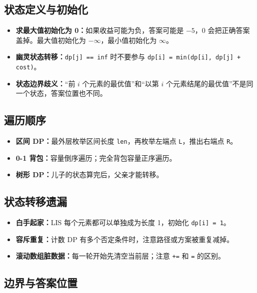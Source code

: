 \documentclass[UTF8,openany,oneside,zihao=-4]{ctexbook}
\begin{document}
\subsection{状态定义与初始化}

\begin{itemize}
  \item \textbf{求最大值初始化为 0：}如果收益可能为负，答案可能是 $-5$，0 会把正确答案盖掉。最大值初始化为 $-\infty$，最小值初始化为 $\infty$。
  \item \textbf{幽灵状态转移：}\lstinline!dp[j] == inf! 时不要参与 \lstinline!dp[i] = min(dp[i], dp[j] + cost)!。
  \item \textbf{状态边界歧义：}“前 $i$ 个元素的最优值”和“以第 $i$ 个元素结尾的最优值”不是同一个状态，答案位置也不同。
\end{itemize}

\subsection{遍历顺序}

\begin{itemize}
  \item \textbf{区间 DP：}最外层枚举区间长度 \lstinline!len!，再枚举左端点 \lstinline!L!，推出右端点 \lstinline!R!。
  \item \textbf{0-1 背包：}容量倒序遍历；完全背包容量正序遍历。
  \item \textbf{树形 DP：}儿子的状态算完后，父亲才能转移。
\end{itemize}

\subsection{状态转移遗漏}

\begin{itemize}
  \item \textbf{白手起家：}LIS 每个元素都可以单独成为长度 1，初始化 \lstinline!dp[i] = 1!。
  \item \textbf{容斥重复：}计数 DP 有多个否定条件时，注意路径或方案被重复减掉。
  \item \textbf{滚动数组脏数据：}每一轮开始先清空当前层；注意 \lstinline!+=! 和 \lstinline!=! 的区别。
\end{itemize}

\subsection{边界与答案位置}
\end{document}
